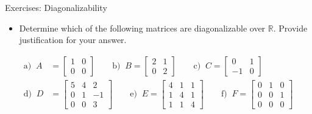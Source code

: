     \begin{frame}{Exercises: Diagonalizability }
    \begin{itemize}
        \item Determine which of the following matrices are diagonalizable over \( \mathbb{R} \). Provide justification for your answer.
    \end{itemize}

    \vspace{0.5em}
    \begin{align*}
        \text{a)}\;\; A &= \begin{bmatrix}
            1 & 0 \\
            0 & 0
        \end{bmatrix} 
        \qquad 
        \text{b)}\;\; B = \begin{bmatrix}
            2 & 1 \\
            0 & 2
        \end{bmatrix} 
        \qquad 
        \text{c)}\;\; C = \begin{bmatrix}
            0 & 1 \\
            -1 & 0
        \end{bmatrix} \\[1.5em]
        \text{d)}\;\; D &= \begin{bmatrix}
            5 & 4 & 2 \\
            0 & 1 & -1 \\
            0 & 0 & 3
        \end{bmatrix}
        \qquad 
        \text{e)}\;\; E = \begin{bmatrix}
            4 & 1 & 1 \\
            1 & 4 & 1 \\
            1 & 1 & 4
        \end{bmatrix} 
        \qquad 
        \text{f)}\;\; F = \begin{bmatrix}
            0 & 1 & 0 \\
            0 & 0 & 1 \\
            0 & 0 & 0
        \end{bmatrix}
    \end{align*}
    \end{frame}




